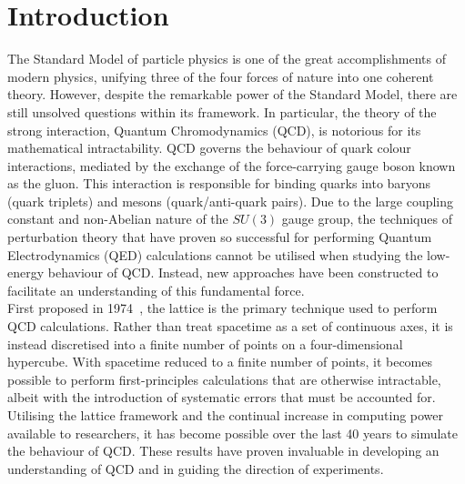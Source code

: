 
\chapter{Introduction}\label{chapter:Introduction}
\ifpdf
    \graphicspath{{Chapter1/Figs/Raster/}{Chapter1/Figs/PDF/}{Chapter1/Figs/}}
\else
    \graphicspath{{Chapter1/Figs/Vector/}{Chapter1/Figs/}}
\fi

The Standard Model of particle physics is one of the great accomplishments of modern physics, unifying three of the four forces of nature into one coherent theory. However, despite the remarkable power of the Standard Model, there are still unsolved questions within its framework. In particular, the theory of the strong interaction, Quantum Chromodynamics (QCD), is notorious for its mathematical intractability. QCD governs the behaviour of quark colour interactions, mediated by the exchange of the force-carrying gauge boson known as the gluon. This interaction is responsible for binding quarks into baryons (quark triplets) and mesons (quark/anti-quark pairs). Due to the large coupling constant and non-Abelian nature of the $SU(3)$ gauge group, the techniques of perturbation theory that have proven so successful for performing Quantum Electrodynamics (QED) calculations cannot be utilised when studying the low-energy behaviour of QCD. Instead, new approaches have been constructed to facilitate an understanding of this fundamental force.\\

First proposed in 1974~\cite{Wilson:1974sk}, the lattice is the primary technique used to perform QCD calculations. Rather than treat spacetime as a set of continuous axes, it is instead discretised into a finite number of points on a four-dimensional hypercube. With spacetime reduced to a finite number of points, it becomes possible to perform first-principles calculations that are otherwise intractable, albeit with the introduction of systematic errors that must be accounted for. Utilising the lattice framework and the continual increase in computing power available to researchers, it has become possible over the last 40 years to simulate the behaviour of QCD. These results have proven invaluable in developing an understanding of QCD and in guiding the direction of experiments.\\

